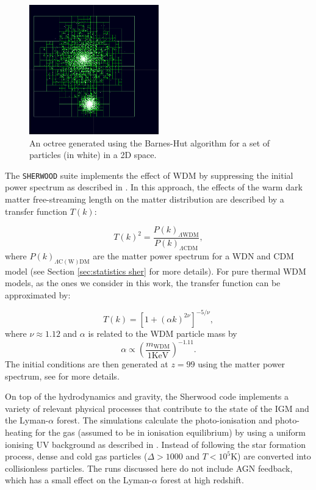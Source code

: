 \begin{figure}
        \centering
        \includegraphics[width=0.5\textwidth]{img/ML/Barnes_hut_tree.png}
        \caption{An octree generated using the Barnes-Hut algorithm for a set of particles (in white) in a 2D space.}
        \label{fig: 2D Barnes Hut}     
\end{figure}



The \texttt{SHERWOOD} suite implements the effect of WDM by suppressing the initial power spectrum as described in \cite{Viel_2005}. In this approach, the effects of the warm dark matter free-streaming length on the matter distribution are described by a transfer function $T(k)$:

\begin{equation}
        T(k)^2=\frac{P(k)_{\Lambda\mathrm{WDM}}}{P(k)_{\Lambda\mathrm{CDM}}},
\end{equation}
where $P(k)_{\Lambda\mathrm{C(W)DM}}$ are the matter power spectrum for a WDN and CDM model (see Section \ref{sec:statistics sher} for more details). For pure thermal WDM models, as the ones we consider in this work, the transfer function can be approximated by:

\begin{equation}
        T(k)=[1+(\alpha k)^{2\nu}]^{-5/\nu},
\end{equation}
where $\nu\approx 1.12$ and $\alpha$ is related to the WDM particle mass by
\begin{equation}
        \alpha \propto \left( \frac{m_\mathrm{WDM}}{1 \mathrm{KeV}} \right)^{-1.11}.
\end{equation}
The initial conditions are then generated at $z=99$ using the matter power spectrum, see \cite{Bolton_2016} for more details.

On top of the hydrodynamics and gravity, the Sherwood code implements a variety of relevant physical processes that contribute to the state of the IGM and the Lyman-$\alpha$ forest. The simulations calculate the photo-ionisation and photo-heating for the gas (assumed to be in ionisation equilibrium) by using a uniform ionising UV background as described in \cite{Haardt2012}. Instead of following the star formation process, dense and cold gas particles ($\Delta>1000$ and $T<10^5$K) are converted into collisionless particles. The runs discussed here do not include AGN feedback, which has a small effect on the Lyman-$\alpha$ forest at high redshift.

